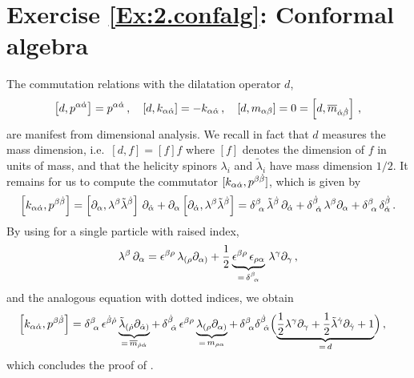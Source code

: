 \section*{Exercise \ref{Ex:2.confalg}: Conformal algebra}
\label{Sol:2.confalg}
%
The commutation relations with the dilatation operator $d$,
\begin{align}
\left[d,p^{\alpha{\dot{\alpha}}} \right]=p^{\alpha{\dot{\alpha}}}\, , \quad \left[d,k_{\alpha{\dot{\alpha}}} \right]=-k_{\alpha{\dot{\alpha}}}\, , \quad 
\left[d,m_{\alpha\beta} \right]=0=\left[d,{\overline m}_{{\dot{\alpha}}{\dot{\beta}}}\right] \,,
\end{align}
are manifest from dimensional analysis. We recall in fact that $d$ measures the mass dimension, i.e.~$[d,f] = [f] f$ where $[f]$ denotes the dimension of $f$ in units of mass, and that the helicity spinors $\lambda_i$ and $\tilde{\lambda}_i$ have mass dimension $1/2$.
%
It remains for us to compute the commutator $[k_{\alpha{\dot{\alpha}}}, p^{\beta{\dot{\beta}}}]$, which is given by
%
\begin{align}
\left[k_{\alpha{\dot{\alpha}}},p^{\beta{\dot{\beta}}} \right] = 
\left[\partial_{\alpha},\lambda^{\beta}\tilde\lambda^{{\dot{\beta}}} \right]\, \partial_{{\dot{\alpha}}}+ \partial_{\alpha} \left[ \partial_{{\dot{\alpha}}}, \lambda^{\beta}\tilde\lambda^{{\dot{\beta}}} \right]
= \delta^{\beta}_{\ \alpha}\, \tilde\lambda^{{\dot{\beta}}}
\, \partial_{{\dot{\alpha}}} + \delta^{{\dot{\beta}}}_{\ {\dot{\alpha}}}\, \lambda^{\beta}\partial_{\alpha}
+ \delta^{\beta}_{\ \alpha}\, \delta^{{\dot{\beta}}}_{{\dot{\alpha}}} \,.
\end{align}
By using  for a single particle with raised index,
%
\begin{align}
\lambda^{\beta}\,\partial_{\alpha} = \epsilon^{\beta\rho} \, 
\lambda_{(\rho} \partial_{\alpha)}+ \frac{1}{2} \underbrace{\epsilon^{\beta\rho}\, \epsilon_{\rho\alpha}}_{=\, \delta^{\beta}_{\ \alpha}} \, \lambda^{\gamma}\partial_{\gamma} \,,
\end{align}
%
and the analogous equation with dotted indices, we obtain
%
\begin{align}
\left[k_{\a\da},p^{\b\db} \right] & = \delta^{\b}_{\ \a}\, \epsilon^{\db\dot\rho} \underbrace{\tilde{\la}_{(\dot{\rho}} \partial_{\dot{\alpha})}}_{ = \, \overline{m}_{\dot{\rho}\dot{\alpha}} }
+ \, \delta^{\db}_{\ \da}\, \epsilon^{\b\rho} \underbrace{\la_{(\rho} \partial_{\alpha)}}_{= \, m_{\rho \alpha}} + \, \delta^{\b}_{\ \a}\delta^{\db}_{\ \da}
 \Bigl( \underbrace{ \frac{1}{2} \la^{\gamma}\partial_{\gamma}+ \frac{1}{2}\tla^{\dot\gamma}\partial_{\dot\gamma}
+ 1}_{= \, d} \Bigr) \,,
\end{align}
%
which concludes the proof of .





